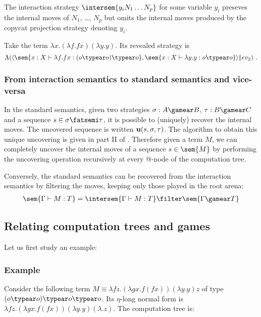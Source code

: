 \begin{remark}
The interaction strategy $\intersem{y_i N_1 \ldots N_p}$ for some variable $y_i$ preseves the
internal moves of $N_1$, \ldots, $N_p$ but omits the
internal moves produced by the copycat projection strategy denoting
$y_i$.
\end{remark}

\begin{example}
Take the term $\lambda x . (\lambda f . f x) (\lambda y . y)$.
Its revealed strategy is $$\Lambda ( \langle \sem{ x:X \vdash \lambda f . f
x : (o\typear o) \typear o} , \sem{ x:X \vdash \lambda y . y
: o \typear o} \rangle \| ev_2 ) \ .$$
\end{example}


\subsubsection{From interaction semantics to standard semantics and vice-versa}

In the standard semantics, given two strategies $\sigma : A
\gamear B$, $\tau : B \gamear C$ and a sequence $s \in
\sigma \fatsemi \tau$, it is possible to (uniquely) recover the
internal moves. The uncovered sequence is written ${\bf u}(s,
\sigma, \tau)$. The algorithm to obtain this unique uncovering is
given in part II of \cite{hylandong_pcf}. Therefore given a term
$M$, we can completely uncover the internal moves of a sequence
$s\in\sem{M}$ by performing the uncovering operation recursively at
every @-node of the computation tree.

Conversely, the standard semantics can be recovered from the
interaction semantics by filtering the moves, keeping only those
played in the root arena:
\begin{eqnarray}
 \sem{\Gamma \vdash M : T} = \intersem{\Gamma \vdash M : T} \filter \sem{\Gamma \gamear T} \label{eqn:int_std_gamsem}
\end{eqnarray}




\subsection{Relating computation trees and games}
Let us first study an example:
\subsubsection{Example}
Consider the following term $M \equiv \lambda f z . (\lambda g x . f (f x)) (\lambda y. y) z$ of type $(o \typear o) \typear o \typear o$.
Its $\eta$-long normal form is $\lambda f z . (\lambda g x . f (f x)) (\lambda y. y) (\lambda .z)$.
The computation tree is:

